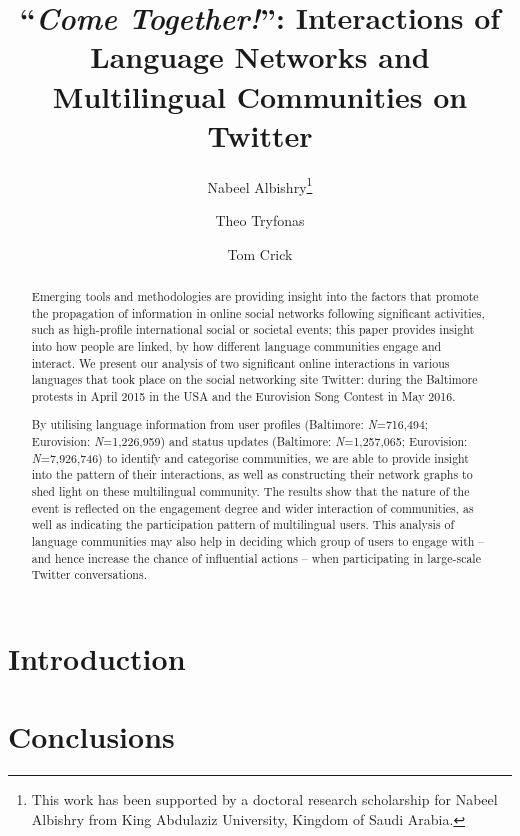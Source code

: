 \documentclass{llncs}
\begin{document}
\title{``{\emph{Come Together!}}'': Interactions of Language Networks and Multilingual Communities on Twitter}

\author{Nabeel Albishry\thanks{This work has been supported by a doctoral research scholarship for
Nabeel Albishry from King Abdulaziz University, Kingdom of Saudi
Arabia.} \and Theo Tryfonas \and Tom
  Crick}



\maketitle

\begin{abstract}
Emerging tools and methodologies are providing insight into the
factors that promote the propagation of information in online social
networks following significant activities, such as high-profile
international social or societal events; this paper provides insight
into how people are linked, by how different language communities
engage and interact. We present our analysis of two significant online
interactions in various languages that took place on the social
networking site Twitter: during the Baltimore protests in April 2015
in the USA and the Eurovision Song Contest in May 2016.

By utilising language information from user profiles (Baltimore:
{\emph{N}}=716,494; Eurovision: {\emph{N}}=1,226,959) and status
updates (Baltimore: {\emph{N}}=1,257,065; Eurovision:
{\emph{N}}=7,926,746) to identify and categorise communities, we are
able to provide insight into the pattern of their interactions, as
well as constructing their network graphs to shed light on these
multilingual community. The results show that the nature of the event
is reflected on the engagement degree and wider interaction of
communities, as well as indicating the participation pattern of
multilingual users. This analysis of language communities may also
help in deciding which group of users to engage with -- and hence
increase the chance of influential actions -- when participating in
large-scale Twitter conversations.
\end{abstract}

\section{Introduction}

\section{Conclusions}



\end{document}
